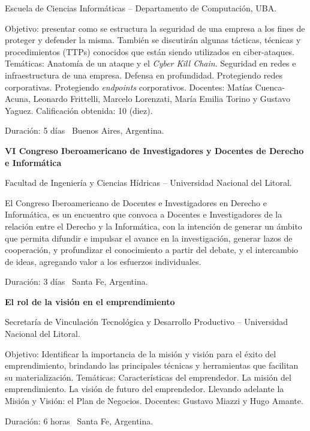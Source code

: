\documentclass[letterpaper,MMMyyyy,nonstop]{simpleresumecv}
\begin{document}
\begin{body}
\BulletItem Escuela de Ciencias Informáticas – Departamento de Computación, UBA.
\begin{detail}
	\SubBulletItem
	Objetivo: presentar como se estructura la seguridad de una empresa a los fines de proteger y defender la  misma. También se discutirán algunas tácticas, técnicas y procedimientos (TTPs) conocidos que están siendo utilizados en ciber-ataques.
	\SubBulletItem
	Temáticas: Anatomía de un ataque y el \textit{Cyber Kill Chain}. Seguridad en redes e infraestructura de una empresa. Defensa en profundidad. Protegiendo redes corporativas. Protegiendo \textit{endpoints} corporativos.
	\SubBulletItem
	Docentes: Matías Cuenca-Acuna, Leonardo Frittelli, Marcelo Lorenzati,  María  Emilia  Torino  y Gustavo Yaguez.
	\SubBulletItem
	Calificación obtenida: 10 (diez).
\end{detail}
Duración: 5 días \SubBulletSymbol\, Buenos Aires, Argentina.

\BigGap
\textbf{VI Congreso Iberoamericano de Investigadores y Docentes de Derecho e Informática}
\hfill
{}

\BulletItem Facultad de Ingeniería y Ciencias Hídricas – Universidad Nacional del Litoral.
\begin{detail}
	\SubBulletItem
	El Congreso Iberoamericano de Docentes e Investigadores en Derecho e Informática, es un encuentro que convoca a Docentes e Investigadores de la relación entre el Derecho y la Informática, con la intención de generar un ámbito que permita difundir e impulsar el avance en la investigación, generar lazos de cooperación, y profundizar el conocimiento a partir del debate, y el intercambio de ideas, agregando valor a los esfuerzos individuales.
\end{detail}
Duración: 3 días \SubBulletSymbol\, Santa Fe, Argentina.

\BigGap
\textbf{El rol de la visión en el emprendimiento}
\hfill
{}

\BulletItem Secretaría de Vinculación Tecnológica y Desarrollo Productivo – Universidad Nacional del Litoral.
\begin{detail}
	\SubBulletItem
	Objetivo: Identificar la importancia de la misión y visión para el éxito del emprendimiento, brindando las principales técnicas y herramientas que facilitan su materialización.
	\SubBulletItem
	Temáticas: Características del emprendedor. La misión del emprendimiento. La visión de futuro del emprendedor. Llevando adelante la Misión y Visión: el Plan de Negocios.
	\SubBulletItem
	Docentes: Gustavo Miazzi y Hugo Amante. 
\end{detail}
Duración: 6 horas \SubBulletSymbol\, Santa Fe, Argentina.


\end{body}
\end{document}
